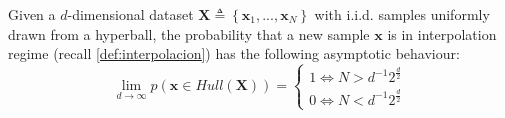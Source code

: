 \begin{theorem}\cite{barany1988shape}\label{dparadoxa}
	Given a $d$-dimensional dataset $\mathbf X \triangleq \left\{\mathbf{x}_1,...,\mathbf{x}_N\right\}$ with i.i.d. samples uniformly drawn from a hyperball, the probability that a new sample $\mathbf{x}$ is in interpolation regime (recall \autoref{def:interpolacion}) has the following asymptotic behaviour:\\
	
	\begin{equation}
		\lim_{d \to \infty}p(\mathbf{x}\in Hull(\mathbf{X}))=
		\begin{cases}
			1 \iff N>d^{-1}2^{\frac{d}{2}}\\
			0 \iff N<d^{-1}2^{\frac{d}{2}}
		\end{cases}	
	\end{equation}
\end{theorem}

